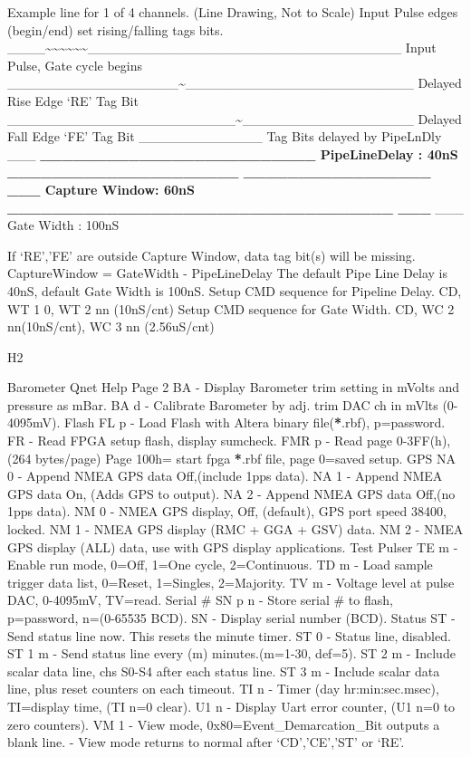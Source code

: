 \documentclass[letterpaper,10pt,english]{sphinxmanual}
\begin{document}
Example line for 1 of 4 channels. (Line Drawing, Not to Scale)
Input Pulse edges (begin/end) set rising/falling tags bits.
\_\_\_\_\textasciitilde{}\textasciitilde{}\textasciitilde{}\textasciitilde{}\textasciitilde{}\textasciitilde{}\_\_\_\_\_\_\_\_\_\_\_\_\_\_\_\_\_\_\_\_\_\_\_\_\_\_\_\_\_\_\_\_\_ Input Pulse, Gate cycle begins
\_\_\_\_\_\_\_\_\_\_\_\_\_\_\_\_\_\_\textasciitilde{}\_\_\_\_\_\_\_\_\_\_\_\_\_\_\_\_\_\_\_\_\_\_\_\_ Delayed Rise Edge `RE' Tag Bit
\_\_\_\_\_\_\_\_\_\_\_\_\_\_\_\_\_\_\_\_\_\_\_\_\textasciitilde{}\_\_\_\_\_\_\_\_\_\_\_\_\_\_\_\_\_\_ Delayed Fall Edge `FE' Tag Bit
\_\_\_\_\_\_\_\_\_\_\_\_\_                           Tag Bits delayed by PipeLnDly
\_\_\_\textbar{}        {\color{red}\bfseries{}\textbar{}\_\_\_\_\_\_\_\_\_\_\_\_\_\_\_\_\_\_\_\_\_\_\_\_\_ PipeLineDelay :   40nS
\_\_\_\_\_\_\_\_\_\_\_\_\_\_\_\_\_\_\_\_\_
\_\_\_\_\_\_\_\_\_\_\_\_\_\_\_\_\_\textbar{}}                     {\color{red}\bfseries{}\textbar{}\_\_\_ Capture Window:   60nS
\_\_\_\_\_\_\_\_\_\_\_\_\_\_\_\_\_\_\_\_\_\_\_\_\_\_\_\_\_\_\_\_\_\_\_
\_\_\_\textbar{}}                                   {\color{red}\bfseries{}\textbar{}}\_\_\_ Gate Width    :  100nS

If `RE','FE' are outside Capture Window, data tag bit(s) will be missing.
CaptureWindow = GateWidth - PipeLineDelay
The default Pipe Line Delay is 40nS, default Gate Width is 100nS.
Setup CMD sequence for Pipeline Delay.  CD,  WT 1 0, WT 2 nn (10nS/cnt)
Setup CMD sequence for Gate Width.  CD, WC 2 nn(10nS/cnt), WC 3 nn (2.56uS/cnt)

H2

Barometer      Qnet Help Page 2
BA      - Display Barometer trim setting in mVolts and pressure as mBar.
BA d    - Calibrate Barometer by adj. trim DAC ch in mVlts (0-4095mV).
Flash
FL p    - Load Flash with Altera binary file({\color{red}\bfseries{}*}.rbf), p=password.
FR      - Read FPGA setup flash, display sumcheck.
FMR p   - Read page 0-3FF(h), (264 bytes/page)
Page 100h= start fpga {\color{red}\bfseries{}*}.rbf file, page 0=saved setup.
GPS
NA 0    - Append NMEA GPS data Off,(include 1pps data).
NA 1    - Append NMEA GPS data On, (Adds GPS to output).
NA 2    - Append NMEA GPS data Off,(no 1pps data).
NM 0    - NMEA GPS display, Off, (default), GPS port speed 38400, locked.
NM 1    - NMEA GPS display (RMC + GGA + GSV) data.
NM 2    - NMEA GPS display (ALL) data, use with GPS display applications.
Test Pulser
TE m    - Enable run mode,  0=Off, 1=One cycle, 2=Continuous.
TD m    - Load sample trigger data list, 0=Reset, 1=Singles, 2=Majority.
TV m    - Voltage level at pulse DAC, 0-4095mV, TV=read.
Serial \#
SN p n  - Store serial \# to flash, p=password, n=(0-65535 BCD).
SN      - Display serial number (BCD).
Status
ST      - Send status line now.  This resets the minute timer.
ST 0    - Status line, disabled.
ST 1 m  - Send status line every (m) minutes.(m=1-30, def=5).
ST 2 m  - Include scalar data line, chs S0-S4 after each status line.
ST 3 m  - Include scalar data line, plus reset counters on each timeout.
TI n     - Timer (day hr:min:sec.msec), TI=display time, (TI n=0 clear).
U1 n     - Display Uart error counter, (U1 n=0 to zero counters).
VM 1     - View mode, 0x80=Event\_Demarcation\_Bit outputs a blank line.
- View mode returns to normal after `CD','CE','ST' or `RE'.
\end{document}
